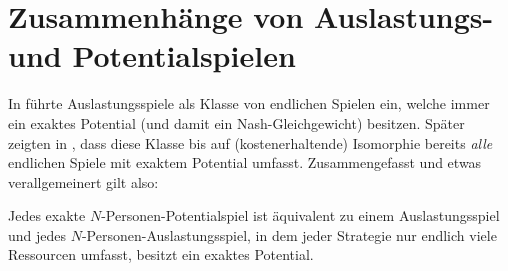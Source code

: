 \section{Zusammenhänge von Auslastungs- und Potentialspielen}\label{sec:Auslastungsspiele}

In \cite{RosenthalPotential} führte \citeauthor{RosenthalPotential} Auslastungsspiele als Klasse von endlichen Spielen ein, welche immer ein exaktes Potential (und damit ein Nash-Gleichgewicht) besitzen. Später zeigten \citeauthor{MonShap} in \cite[Theorem 3.2]{MonShap}, dass diese Klasse bis auf (kostenerhaltende) Isomorphie bereits \emph{alle} endlichen Spiele mit exaktem Potential umfasst. Zusammengefasst und etwas verallgemeinert gilt also:

\begin{satz}\label{satz:MondererShapley}
	Jedes exakte $N$-Personen-Potentialspiel ist äquivalent zu einem Auslastungsspiel und jedes $N$-Personen-Auslastungsspiel, in dem jeder Strategie nur endlich viele Ressourcen umfasst, besitzt ein exaktes Potential.
\end{satz}

